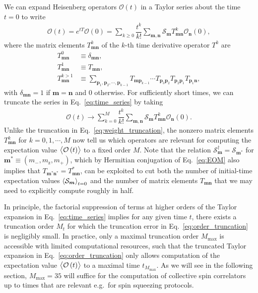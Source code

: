\documentclass[pra,reprint,longbibliography]{revtex4-1}
\renewcommand{\t}{\text} %
\newcommand{\f}[2]{\dfrac{#1}{#2}} %
\newcommand{\p}[1]{\left(#1\right)} %
\renewcommand{\v}{\bm} %
\newcommand{\bk}{\Braket} %
\renewcommand{\O}{\mathcal{O}}
\renewcommand{\S}{\mathcal{S}}
\newcommand{\z}{\text{z}}
\newcommand{\1}{\mathds{1}}
\begin{document}
We can expand Heisenberg operators $\O\p{t}$ in a Taylor series about
the time $t=0$ to write
\begin{align}
  \O\p{t}
  = e^{t T} \O\p{0}
  = \sum_{k\ge0} \f{t^k}{k!}
  \sum_{\v m, \v n} \S_{\v m} T^k_{\v m\v n} \O_{\v n}\p{0},
  \label{eq:time_series}
\end{align}
where the matrix elements $T^k_{\v m\v n}$ of the $k$-th time
derivative operator $T^k$ are
\begin{align}
  T^0_{\v m\v n} &\equiv \delta_{\v m\v n}, \\
  T^1_{\v m\v n} &\equiv T_{\v m\v n}, \\
  T^{k>1}_{\v m\v n}
  &\equiv \sum_{\v p_1,\v p_2,\cdots,\v p_{k-1}}
  T_{\v m\v p_{k-1}} \cdots T_{\v p_3\v p_2}
  T_{\v p_2\v p_1} T_{\v p_1\v n},
\end{align}
with $\delta_{\v m\v n}=1$ if $\v m=\v n$ and 0 otherwise.  For
sufficiently short times, we can truncate the series in
Eq.~\eqref{eq:time_series} by taking
\begin{align}
  \O\p{t}
  \to \sum_{k=0}^M \f{t^k}{k!}
  \sum_{\v m, \v n} \S_{\v m} T^k_{\v m\v n} \O_{\v n}\p{0}.
  \label{eq:order_truncation}
\end{align}
Unlike the truncation in Eq.~\eqref{eq:weight_truncation}, the nonzero
matrix elements $T^k_{\v m\v n}$ for $k=0,1,\cdots,M$ now tell us
which operators are relevant for computing the expectation value
$\bk{\O\p{t}}$ to a fixed order $M$.  Note that the relation
$\S_{\v m}^\dag=\S_{\v m^*}$ for $\v m^*\equiv\p{m_-,m_\z,m_+}$, which
by Hermitian conjugation of Eq.~\eqref{eq:EOM} also implies that
$T_{\v m^*\v n^*}=T_{\v m\v n}^*$, can be exploited to cut both the
number of initial-time expectation values $\bk{\S_{\v m}}_{t=0}$ and
the number of matrix elements $T_{\v m\v n}$ that we may need to
explicitly compute roughly in half.

In principle, the factorial suppression of terms at higher orders of
the Taylor expansion in Eq.~\eqref{eq:time_series} implies for any
given time $t$, there exists a truncation order $M_t$ for which the
truncation error in Eq.~\eqref{eq:order_truncation} is negligibly
small.  In practice, only a maximal truncation order $M_{\t{max}}$ is
accessible with limited computational resources, such that the
truncated Taylor expansion in Eq.~\eqref{eq:order_truncation} only
allows computation of the expectation value $\bk{\O\p{t}}$ to a
maximal time $t_{M_{\t{max}}}$.  As we will see in the following
section, $M_{\t{max}}=35$ will suffice for the computation of
collective spin correlators up to times that are relevant e.g.~for
spin squeezing protocols.
\end{document}
